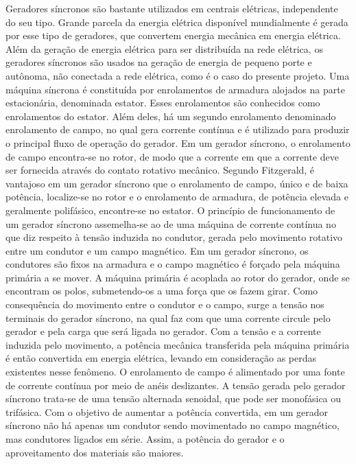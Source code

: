 Geradores síncronos são bastante utilizados em centrais elétricas, independente do seu tipo. Grande parcela da energia elétrica disponível mundialmente é gerada por esse tipo de geradores, que convertem energia mecânica em energia elétrica. Além da geração de energia elétrica para ser distribuída na rede elétrica, os geradores síncronos são usados na geração de energia de pequeno porte e autônoma, não conectada a rede elétrica, como é o caso do presente projeto. 
Uma máquina síncrona é constituída por enrolamentos de armadura alojados na parte estacionária, denominada estator. Esses enrolamentos são conhecidos como enrolamentos do estator. Além deles, há um segundo enrolamento denominado enrolamento de campo, no qual gera corrente contínua e é utilizado para produzir o principal fluxo de operação do gerador. Em um gerador síncrono, o enrolamento de campo encontra-se no rotor, de modo que a corrente em que a corrente deve ser fornecida através do contato rotativo mecânico.  Segundo Fitzgerald, é vantajoso em um gerador síncrono que o enrolamento de campo, único e de baixa potência, localize-se no rotor e o enrolamento de armadura, de potência elevada e geralmente polifásico, encontre-se no estator.
O princípio de funcionamento de um gerador síncrono assemelha-se ao de uma máquina de corrente contínua no que diz respeito à tensão induzida no condutor, gerada pelo movimento rotativo entre um condutor e um campo magnético. Em um gerador síncrono, os condutores são fixos na armadura e o campo magnético é forçado pela máquina primária a se mover. A máquina primária é acoplada ao rotor do gerador, onde se encontram os polos, submetendo-os a uma força que os fazem girar. Como consequência do movimento entre o condutor e o campo, surge a tensão nos terminais do gerador síncrono, na qual faz com que uma corrente circule pelo gerador e pela carga que será ligada no gerador. Com a tensão e a corrente induzida pelo movimento, a potência mecânica transferida pela máquina primária é então convertida em energia elétrica, levando em consideração as perdas existentes nesse fenômeno. O enrolamento de campo é alimentado por uma fonte de corrente contínua por meio de anéis deslizantes. A tensão gerada pelo gerador síncrono trata-se de uma tensão alternada senoidal, que pode ser monofásica ou trifásica.
Com o objetivo de aumentar a potência convertida, em um gerador síncrono não há apenas um condutor sendo movimentado no campo magnético, mas condutores ligados em série. Assim, a potência do gerador e o aproveitamento dos materiais são maiores. 

